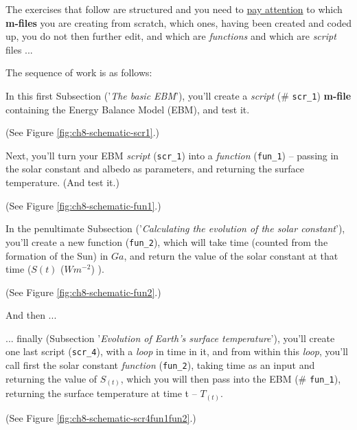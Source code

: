 \documentclass{tufte-book} %
\begin{document}
The exercises that follow are structured and you need to \uline{pay attention} to which \textbf{m-files} you are creating from scratch, which ones, having been created and coded up, you  do not then further edit, and which are \textit{functions} and which are \textit{script} files ... 

The sequence of work is as follows:

\begin{description}[align=right]

\setlength{\itemindent}{-0.2in}

\item [6.1.1] In this first Subsection ('\textit{The basic EBM}'), you'll  create a \textit{script} (\# \texttt{scr\_1}) \textbf{m-file} containing the Energy Balance Model (EBM), and test it.

\noindent (See Figure \ref{fig:ch8-schematic-scr1}.)

\item [6.1.2] Next, you'll turn your EBM \textit{script} (\texttt{scr\_1}) into a \textit{function} (\texttt{fun\_1}) -- passing in the solar constant and albedo as parameters, and returning the surface temperature. (And test it.)

\noindent (See Figure \ref{fig:ch8-schematic-fun1}.)

\item [6.1.3] In the penultimate Subsection ('\textit{Calculating the evolution of the solar constant}'), you'll create a new function (\texttt{fun\_2}), which will take time (counted from the formation of the Sun) in \(Ga\), and return the value of the solar constant at that time (\(S(t)\) (\(Wm^{-2}\)) ).

\noindent (See Figure \ref{fig:ch8-schematic-fun2}.)

And then ...

\item [6.1.4] ... finally (Subsection '\textit{Evolution of Earth's surface temperature}'), you'll create one last script (\texttt{scr\_4}), with a \textit{loop} in time in it, and from within this \textit{loop}, you'll call first the solar constant \textit{function} (\texttt{fun\_2}), taking time as an input and returning the value of \(S_{(t)}\), which you will then pass into the EBM (\# \texttt{fun\_1}), returning the surface temperature at time t --  \(T_{(t)}\).

\noindent (See Figure \ref{fig:ch8-schematic-scr4fun1fun2}.)

\end{description}
\end{document}
